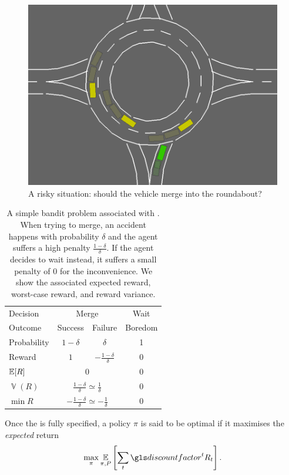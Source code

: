 \begin{figure}[ht]
	\centering
	\includegraphics[trim={0 0.5cm 0 0}, clip, width=0.6\linewidth]{img/roundabout3-small}
	\caption{A risky situation: should the vehicle merge into the roundabout?}
	\label{fig:risky-problem}
\end{figure}
\begin{table}[ht]
	\centering
	\begin{tabular}{lccc}
		\toprule
		Decision & \multicolumn{2}{c}{Merge} & Wait \\
		\cmidrule(lr){2-3}
		\cmidrule(lr){4-4}
		Outcome & Success & Failure & Boredom \\
		Probability & $1-\delta$ & $\delta$ & 1 \\
		Reward & $1$ & $-\frac{1-\delta}{\delta}$ & 0 \\
		\midrule
		$\operatorname*{\mathbb{E}}[R]$ & \multicolumn{2}{c}{$0$} & $0$ \\
		$\mathop{\mathbb{V}}(R)$ & \multicolumn{2}{c}{$\frac{1-\delta}{\delta} \simeq \frac{1}{\delta}$} & $0$ \\
		$\min R$ & \multicolumn{2}{c}{$-\frac{1-\delta}{\delta} \simeq -\frac{1}{\delta}$} & $0$ \\
		\bottomrule	
	\end{tabular}
	\caption{A simple bandit problem associated with . When trying to merge, an accident happens with probability $\delta$ and the agent suffers a high penalty $\frac{1-\delta}{\delta}$. If the agent decides to wait instead, it suffers a small penalty of $0$ for the inconvenience. We show the associated expected reward, worst-case reward, and reward variance.}
	\label{tab:risky-problem}
\end{table}

Once the  is fully specified, a policy $\pi$ is said to be optimal if it maximises the \emph{expected} return
\begin{equation*}
\max_\pi \expectedvalue_{\pi, P} \left[\sum_t \discount^t R_t \right].
\end{equation*}

